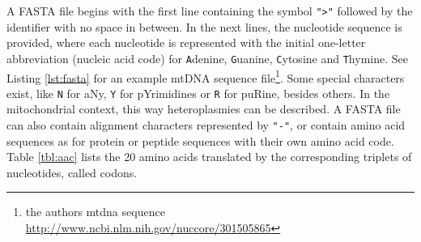 A FASTA file begins with the first line containing the symbol \verb|">"| followed by the identifier with no space in between. In the next lines, the nucleotide sequence is provided, where each nucleotide is represented with the initial one-letter abbreviation (nucleic acid code) for \verb|A|denine, \verb|G|uanine, \verb|C|ytosine and \verb|T|hymine. See Listing  \ref{lst:fasta} for an example mtDNA sequence file\footnote{the authors mtdna sequence \url{http://www.ncbi.nlm.nih.gov/nuccore/301505865}}. Some special characters exist, like \verb|N| for aNy, \verb|Y| for pYrimidines or \verb|R| for puRine, besides others. In the mitochondrial context, this way heteroplasmies can be described. A FASTA file can also contain alignment characters represented by \verb|"-"|,  or contain amino acid sequences as for protein or peptide sequences with their own amino acid code. Table \ref{tbl:aac} lists the 20 amino acids translated by the corresponding triplets of nucleotides, called codons.

